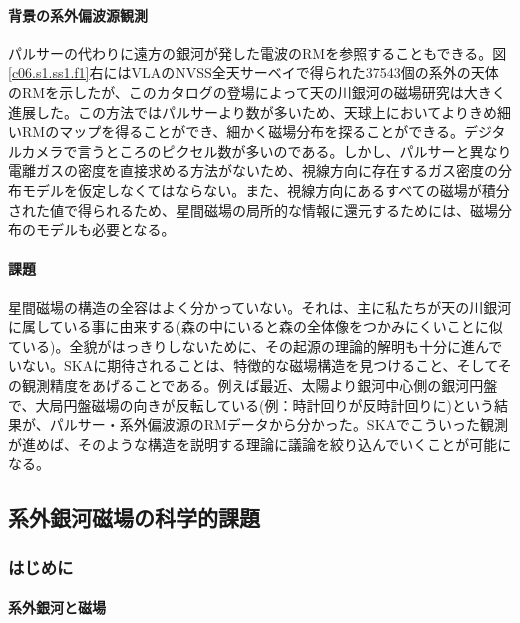 \paragraph{背景の系外偏波源観測}

パルサーの代わりに遠方の銀河が発した電波のRMを参照することもできる。図\ref{c06.s1.ss1.f1}右にはVLAのNVSS全天サーベイで得られた37543個の系外の天体のRMを示したが、このカタログの登場によって天の川銀河の磁場研究は大きく進展した。この方法ではパルサーより数が多いため、天球上においてよりきめ細いRMのマップを得ることができ、細かく磁場分布を探ることができる。デジタルカメラで言うところのピクセル数が多いのである。しかし、パルサーと異なり電離ガスの密度を直接求める方法がないため、視線方向に存在するガス密度の分布モデルを仮定しなくてはならない。また、視線方向にあるすべての磁場が積分された値で得られるため、星間磁場の局所的な情報に還元するためには、磁場分布のモデルも必要となる。

\paragraph{課題}

星間磁場の構造の全容はよく分かっていない。それは、主に私たちが天の川銀河に属している事に由来する(森の中にいると森の全体像をつかみにくいことに似ている)。全貌がはっきりしないために、その起源の理論的解明も十分に進んでいない。SKAに期待されることは、特徴的な磁場構造を見つけること、そしてその観測精度をあげることである。例えば最近、太陽より銀河中心側の銀河円盤で、大局円盤磁場の向きが反転している(例：時計回りが反時計回りに)という結果が、パルサー・系外偏波源のRMデータから分かった\citep{1406.0283}。SKAでこういった観測が進めば、そのような構造を説明する理論に議論を絞り込んでいくことが可能になる。


\subsection{系外銀河磁場の科学的課題}
\label{c06.s1.ss3}

\subsubsection{はじめに}
\label{c06.s1.ss3.sss1}

\paragraph{系外銀河と磁場}

